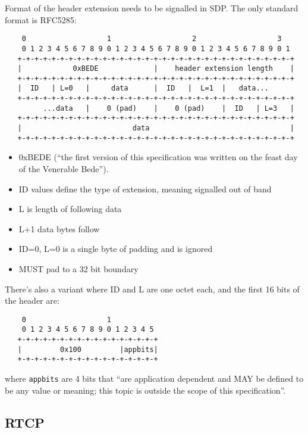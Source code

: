 \documentclass[10pt,a4paper]{article}
\begin{document}
Format of the header extension needs to be signalled in SDP. The only
standard format is RFC5285:

\footnotesize
\begin{verbatim}
    0                   1                   2                   3
    0 1 2 3 4 5 6 7 8 9 0 1 2 3 4 5 6 7 8 9 0 1 2 3 4 5 6 7 8 9 0 1
   +-+-+-+-+-+-+-+-+-+-+-+-+-+-+-+-+-+-+-+-+-+-+-+-+-+-+-+-+-+-+-+-+
   |            0xBEDE             |    header extension length    |
   +-+-+-+-+-+-+-+-+-+-+-+-+-+-+-+-+-+-+-+-+-+-+-+-+-+-+-+-+-+-+-+-+
   |  ID   | L=0   |     data      |  ID   |  L=1  |   data...
   +-+-+-+-+-+-+-+-+-+-+-+-+-+-+-+-+-+-+-+-+-+-+-+-+-+-+-+-+-+-+-+-+
         ...data   |    0 (pad)    |    0 (pad)    |  ID   | L=3   |
   +-+-+-+-+-+-+-+-+-+-+-+-+-+-+-+-+-+-+-+-+-+-+-+-+-+-+-+-+-+-+-+-+
   |                          data                                 |
   +-+-+-+-+-+-+-+-+-+-+-+-+-+-+-+-+-+-+-+-+-+-+-+-+-+-+-+-+-+-+-+-+
\end{verbatim}
\normalsize

\begin{itemize}
  \item 0xBEDE (``the first version of this specification was written on
    the feast day of the Venerable Bede'').
  \item ID values define the type of extension, meaning signalled out of 
    band
  \item L is length of following data
  \item L+1 data bytes follow
  \item ID=0, L=0 is a single byte of padding and is ignored
  \item MUST pad to a 32 bit boundary
\end{itemize}

There's also a variant where ID and L are one octet each, and the first 16
bits of the header are:
\footnotesize
\begin{verbatim}
    0                   1
    0 1 2 3 4 5 6 7 8 9 0 1 2 3 4 5
   +-+-+-+-+-+-+-+-+-+-+-+-+-+-+-+-+
   |         0x100         |appbits|
   +-+-+-+-+-+-+-+-+-+-+-+-+-+-+-+-+
\end{verbatim}
\normalsize
where \verb|appbits| are 4 bits that ``are application dependent and MAY be
defined to be any value or meaning; this topic is outside the scope of this
specification''.

\subsection{RTCP}
\end{document}
